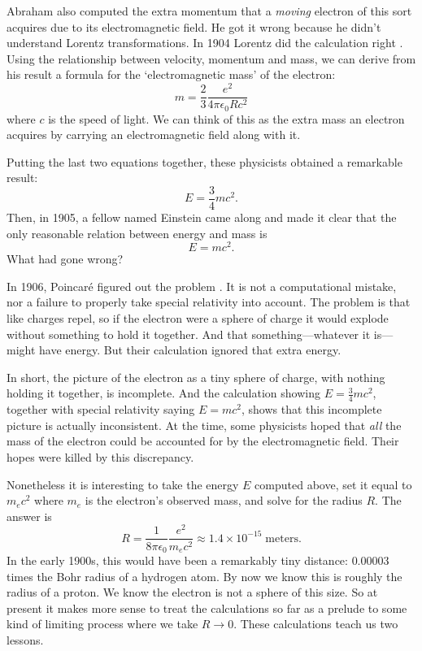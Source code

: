 \documentclass[12pt]{article}
\begin{document}
Abraham also computed the extra momentum that a \emph{moving} electron of this sort acquires due to its electromagnetic field.   He got it wrong because he didn't understand Lorentz transformations.  In 1904 Lorentz did the calculation right \cite{Lorentz}.
Using the relationship between velocity, momentum and mass, we can derive from his result a formula for the `electromagnetic mass' of the electron:
\[    m =  \frac{2}{3} \frac{e^2}{4 \pi \epsilon_0 R c^2}  \]
where $c$ is the speed of light.  We can think of this as the extra mass an electron acquires by carrying an electromagnetic field along with it.  

Putting the last two equations together, these physicists obtained a remarkable result:
\[  E = \frac{3}{4} mc^2 .\]
Then, in 1905, a fellow named Einstein came along and made it clear that the only reasonable relation between energy and mass is
\[   E = mc^2 .\]
What had gone wrong?  

In 1906, Poincar\'e figured out the problem \cite{Poincare}.  It is not a computational mistake, nor a failure to properly take special relativity into account.   The problem is that like charges repel, so if the electron were a sphere of charge it would explode without something to hold it together.   And that something---whatever it is---might have energy.  But their calculation ignored that extra energy.  

In short, the picture of the electron as a tiny sphere of charge, with nothing holding it together, is incomplete.   And the calculation showing $E = \frac{3}{4}mc^2$, together with special relativity saying $E = mc^2$, shows that this incomplete picture is actually inconsistent.  At the time, some physicists hoped that \emph{all} the mass of the electron could be accounted for by the electromagnetic field.  Their hopes were killed by
this discrepancy.

Nonetheless it is interesting to take the energy $E$ computed above, set it equal to $m_e c^2$ where $m_e$ is the electron's observed mass, and solve for the radius $R$.  The answer is 
\[     \displaystyle{  R = \frac{1}{8 \pi \epsilon_0} \frac{e^2}{m_e c^2} } \approx
1.4 \times 10^{-15} \; \mathrm{meters} .\]
In the early 1900s, this would have been a remarkably tiny distance: $0.00003$ times the Bohr radius of a hydrogen atom.  By now we know this is roughly the radius of a proton.  
We know the electron is not a sphere of this size.  So at present it makes more sense to treat the calculations so far as a prelude to some kind of limiting process where we take $R \to 0$.  These calculations teach us two lessons.  
\end{document}
